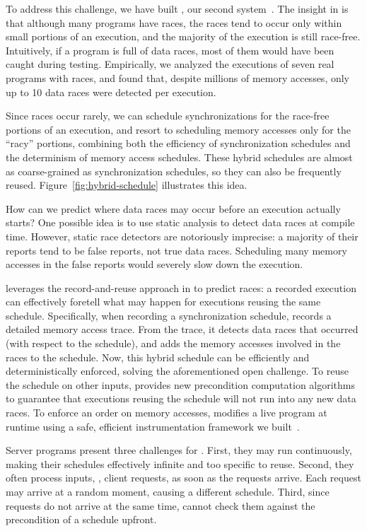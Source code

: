 To address this challenge, we have built \peregrine, our second \smt
system~\cite{peregrine:sosp11}.  The insight in \peregrine is that although
many programs have races, the races tend to occur only within small
portions of an execution, and the majority of the execution is still
race-free.  Intuitively, if a program is full of data races, most of them
would have been caught during testing.  Empirically, we analyzed the
executions of seven real programs with races, and found that, despite
millions of memory accesses, only up to 10 data races were detected per
execution.

Since races occur rarely, we can schedule synchronizations for the
race-free portions of an execution, and resort to scheduling memory
accesses only for the ``racy'' portions, combining both the efficiency of
synchronization schedules and the determinism of memory access schedules.
These hybrid schedules are almost as coarse-grained as synchronization
schedules, so they can also be frequently reused.  
Figure~\ref{fig:hybrid-schedule} illustrates this idea.

How can we predict where data races may occur before an execution actually
starts?  One possible idea is to use static analysis to detect data races
at compile time.
However, static race detectors are notoriously imprecise: a majority of
their reports tend to be false reports, not true data races.  Scheduling
many memory accesses in the false reports would severely slow down the
execution.

\peregrine leverages the record-and-reuse approach in \tern to predict races:
a recorded execution can effectively foretell what may happen for
executions reusing the same schedule.  Specifically, when recording a
synchronization schedule, \peregrine records a detailed memory access trace.
From the trace, it detects data races that occurred (with respect to the
schedule), and adds the memory accesses involved in the races to the
schedule.  Now, this hybrid schedule can be efficiently and
deterministically enforced, solving the aforementioned open challenge.
To reuse the schedule on other inputs, \peregrine provides new precondition
computation algorithms to guarantee that executions reusing the schedule
will not run into any new data races. To enforce an order on memory
accesses, \peregrine modifies a live program at runtime using
a safe, efficient instrumentation framework we built~\cite{wu:loom:osdi10}.

Server programs present three challenges for \smt. First, they may run
continuously, making their schedules effectively infinite and too specific
to reuse.  Second, they often process inputs, \ie, client requests, as
soon as the requests arrive. Each request may arrive at a random moment,
causing a different schedule. Third, since requests do not arrive at the
same time, \peregrine cannot check them against the precondition of a
schedule upfront.

